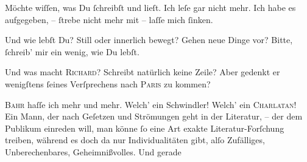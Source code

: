 \pstart
           Möchte wiſſen, was Du{ }ſchreibſt und lieſt. Ich leſe gar nicht mehr. Ich habe es
               aufgegeben, –{ }ſtrebe nicht mehr mit – laſſe mich{ }ſinken.\pend
           
\pstart
           Und wie lebſt Du? Still oder innerlich bewegt? Gehen neue Dinge vor? Bitte,{ }ſchreib’
               mir ein wenig, wie Du lebſt.\pend
           
\pstart
           Und was macht \textsc{Richard}? Schreibt natürlich keine Zeile? Aber gedenkt {\pb}er wenigſtens{ }ſeines Verſprechens nach \textsc{Paris} zu kommen?\pend
           
\pstart
           \textsc{Bahr} haſſe ich mehr und mehr. Welch’ ein Schwindler! Welch’ ein \textsc{Charlatan}! Ein Mann, der nach
               Geſetzen und Strömungen geht in der Literatur, – der dem Publikum einreden will, man
               könne{ }ſo eine Art exakte Literatur-Forſchung treiben, während es doch da nur
               Individualitäten gibt, alſo Zufälliges, Unberechenbares, Geheimnißvolles. Und gerade
